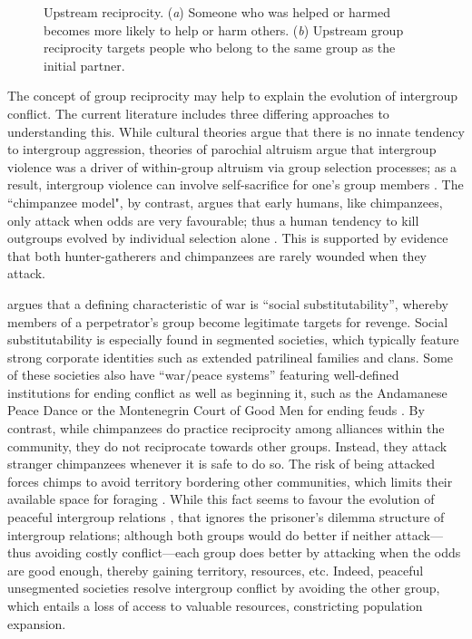 \documentclass[12pt,a4paper]{article}\usepackage[]{graphicx}\usepackage[]{color}
\begin{document}
\begin{figure}
\begin{center}
\begin{subfigure}[b]{0.4\textwidth}
            \caption{}\label{group}
        \end{subfigure}
        \caption{Upstream reciprocity. (\textit{a}) Someone who was helped or harmed becomes more likely to help or harm others. (\textit{b})
    Upstream group reciprocity targets people who belong to
    the same group as the initial partner.}
        \label{fig:illustration}
	\end{center}
\end{figure}

The concept of group reciprocity may help to explain the evolution of intergroup conflict. The current literature 
includes three differing approaches to understanding this. While cultural theories argue that there is no innate tendency to 
intergroup aggression, theories of parochial altruism argue that intergroup violence was a driver of within-group 
altruism via group selection processes; as a result, intergroup violence can involve self-sacrifice for one's group
members \citep{choi2007coevolution,bowles2009did}. The ``chimpanzee model", by contrast, argues that early humans, like
chimpanzees, only attack when odds are very favourable; thus a human tendency to kill outgroups evolved by individual
selection alone \citep{wrangham2012intergroup}. This is supported by evidence that both 
hunter-gatherers and chimpanzees are rarely wounded when they attack. 

\citet{kelly2000warless} argues that a defining characteristic of war is ``social substitutability'', whereby members 
of a perpetrator's group become legitimate targets for revenge. Social substitutability is especially found in segmented
societies, which typically feature strong corporate identities such as extended patrilineal families and clans. 
Some of these societies also have ``war/peace systems'' featuring well-defined institutions for ending conflict as well as beginning it, such as the Andamanese Peace Dance or the Montenegrin Court of Good Men for ending feuds 
\citep{boehm1984blood}. By 
contrast, while chimpanzees do practice reciprocity among alliances within the community, they  do not 
reciprocate towards other groups. Instead, they attack stranger chimpanzees whenever it is safe to do so. The risk of 
being attacked forces chimps to avoid territory bordering other communities, which limits their available space for foraging 
\citep{wilson2003intergroup}. 
While this fact seems to favour the evolution of peaceful intergroup relations 
\citep{kelly2005evolution}, that ignores the prisoner's dilemma structure of intergroup relations; although both groups would
do better if neither attack---thus avoiding costly conflict---each group does better by attacking when the odds are good enough, thereby gaining territory, resources, etc. Indeed, peaceful unsegmented societies resolve intergroup conflict by avoiding the other group, which entails a loss of access to valuable
resources, constricting population expansion. 
\end{document}
